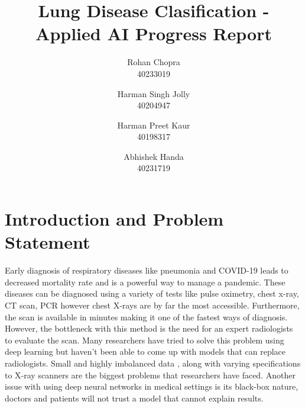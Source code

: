 \documentclass[10pt,twocolumn,letterpaper]{article}
\def\subName{Applied AI }
\begin{document}
\def\cvprPaperID{Group-Q} %
\def\confName{COMP6721}
\def\confYear{2022}

\title{Lung Disease Clasification - \subName Progress Report}
\author{Rohan Chopra\\
\small 40233019\\
\and
Harman Singh Jolly\\
\small 40204947\\
\and
Harman Preet Kaur\\
\small 40198317\\
\and
Abhishek Handa\\
\small 40231719\\
}
\maketitle
\section{Introduction and Problem Statement}
\label{sec:intro}

Early diagnosis of respiratory diseases like pneumonia and COVID-19 leads to decreased mortality rate \cite{daniel2016time} and is a powerful way to manage a pandemic\cite{xu2020facile}. These diseases can be diagnosed using a variety of tests like pulse oximetry, chest x-ray, CT scan\cite{mattsmith2022},  PCR\cite{akhtar1996pcr} however chest X-rays are by far the most accessible\cite{frija2021improve}. Furthermore, the scan is available in minutes making it one of the fastest ways of diagnosis\cite{healthwise2021}. However, the bottleneck with this method is the need for an expert radiologists to evaluate the scan\cite{mehrotra2009radiologists}. Many researchers have tried to solve this problem using deep learning \cite{wang2021deep} but haven't been able to come up with models that can replace radiologists. Small \cite{guefrechi2021deep} and highly imbalanced data \cite{wang2021deep}, along with varying specifications to X-ray scanners are the biggest problems \cite{melissarohman2018} that researchers have faced. Another issue with using deep neural networks in medical settings is its black-box nature\cite{paulblazek2022}, doctors and patients will not trust a model that cannot explain results\cite{aleksandra2019}. 
\end{document}
